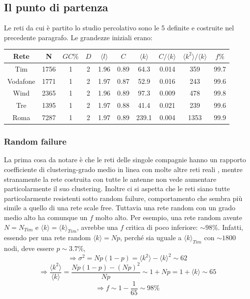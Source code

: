 \subsection{Il punto di partenza}
Le reti da cui è partito lo studio percolativo sono le 5 definite e costruite nel precedente paragrafo. Le grandezze iniziali erano:


\begin{table}[ht!]
\centering
	\begin{tabular}{cccccccccc}
	\toprule
	Rete		&N		&$GC\%$	&$D$	&$\langle l\rangle$	&$C$		&$\langle k\rangle$	&$C/\langle k\rangle$	&$\langle k^2\rangle/\langle k\rangle$	&$f\%$\\
	\midrule  
	Tim		&1756	&1		&2	&1.96			&0.89	&64.3			&0.014				&359							&99.7\\
	Vodafone	&1771	&1		&2	&1.97			&0.87	&52.9			&0.016				&243							&99.6\\
	Wind		&2365	&1		&2	&1.96			&0.89	&97.3			&0.009				&478							&99.8\\
	Tre		&1395	&1		&2	&1.97			&0.88	&41.4			&0.021				&239							&99.6\\
	Roma		&7287	&1		&2	&1.97			&0.89	&239.1			&0.004				&1353							&99.9\\
	\bottomrule
	\end{tabular}
\label{tab:datiInitial}
\end{table}

\subsubsection{Random failure}
La prima cosa da notare è che le reti delle singole compagnie hanno un rapporto coefficiente di clustering-grado medio in linea con molte altre reti reali \parencite{Barbalbert2002}, mentre stranamente la rete costruita con tutte le antenne non vede aumentare particolarmente il suo clustering. Inoltre ci si aspetta che le reti siano tutte particolarmente resistenti sotto random failure, comportamento che sembra più simile a quello di una rete scale free. Tuttavia una rete random con un grado medio alto ha comunque un $f$ molto alto. Per esempio, una rete random avente $N = N_{Tim}$ e $\langle k \rangle = \langle k \rangle_{Tim}$, avrebbe una $f$ critica di poco inferiore: $\sim 98\%$. Infatti, essendo per una rete random $\langle k \rangle = Np$, perché sia uguale a $\langle k \rangle_{Tim}$ con $\sim 1800$ nodi, deve essere $p \sim 3.7\%$, 
$$\Rightarrow \sigma^2 = Np(1-p) = \langle k^2 \rangle - \langle k \rangle^2 \sim 62$$
$$\Rightarrow \frac{\langle k^2 \rangle }{\langle k \rangle} = \frac{Np(1-p)-(Np)^2}{Np} \sim 1+Np = 1+ \langle k \rangle \sim 65$$
$$\Rightarrow f \sim 1 - \frac{1}{65} \sim 98\%$$

